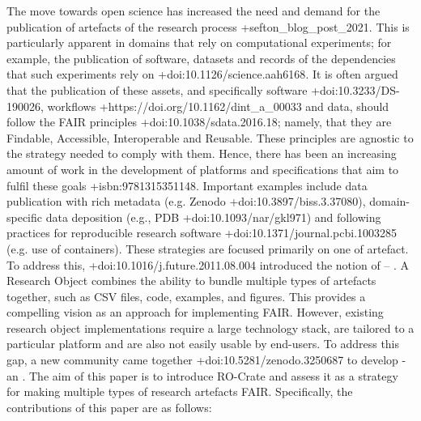 \markdownRendererInterblockSeparator
{}The move towards open science has increased the need and demand for the publication of artefacts of the research process +{}{}{sefton_blog_post_2021}. This is particularly apparent in domains that rely on computational experiments; for example, the publication of software, datasets and records of the dependencies that such experiments rely on +{}{}{doi:10.1126/science.aah6168}. \markdownRendererInterblockSeparator
{}It is often argued that the publication of these assets, and specifically software +{}{}{doi:10.3233/DS-190026}, workflows +{}{}{https://doi.org/10.1162/dint_a_00033} and data, should follow the FAIR principles +{}{}{doi:10.1038/sdata.2016.18}; namely, that they are Findable, Accessible, Interoperable and Reusable. These principles are agnostic to the  strategy needed to comply with them. Hence, there has been an increasing amount of work in the development of platforms and specifications that aim to fulfil these goals +{}{}{isbn:9781315351148}. Important examples include data publication with rich metadata (e.g. Zenodo +{}{}{doi:10.3897/biss.3.37080}), domain-specific data deposition (e.g., PDB +{}{}{doi:10.1093/nar/gkl971}) and following practices for reproducible research software +{}{}{doi:10.1371/journal.pcbi.1003285} (e.g. use of containers). \markdownRendererInterblockSeparator
{}These strategies are focused primarily on one  of artefact. To address this, +{}{}{doi:10.1016/j.future.2011.08.004} introduced the notion of  – . A Research Object combines the ability to bundle multiple types of artefacts together, such as CSV files, code, examples, and figures. This provides a compelling vision as an approach for implementing FAIR. However, existing research object implementations require a large technology stack, are tailored to a particular platform and are also not easily usable by end-users. \markdownRendererInterblockSeparator
{}To address this gap, a new community came together +{}{}{doi:10.5281/zenodo.3250687} to develop  - an . The aim of this paper is to introduce RO-Crate and assess it as a strategy for making multiple types of research artefacts FAIR. Specifically, the contributions of this paper are as follows:\markdownRendererInterblockSeparator
